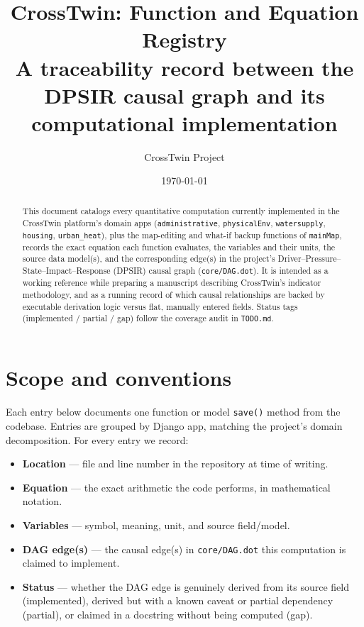 \documentclass[11pt]{article}
\title{CrossTwin: Function and Equation Registry\\
\large A traceability record between the DPSIR causal graph and its computational implementation}
\author{CrossTwin Project}
\date{\today}
\newcommand{\code}[1]{\texttt{#1}}
\newcommand{\statusdone}{\textcolor{green!50!black}{implemented}}
\newcommand{\statuspartial}{\textcolor{orange!80!black}{partial}}
\newcommand{\statusgap}{\textcolor{red!70!black}{gap}}
\begin{document}
\maketitle

\begin{abstract}
This document catalogs every quantitative computation currently implemented in the CrossTwin platform's domain apps (\code{administrative}, \code{physicalEnv}, \code{watersupply}, \code{housing}, \code{urban\_heat}), plus the map-editing and what-if backup functions of \code{mainMap}, records the exact equation each function evaluates, the variables and their units, the source data model(s), and the corresponding edge(s) in the project's Driver--Pressure--State--Impact--Response (DPSIR) causal graph (\code{core/DAG.dot}). It is intended as a working reference while preparing a manuscript describing CrossTwin's indicator methodology, and as a running record of which causal relationships are backed by executable derivation logic versus flat, manually entered fields. Status tags (\statusdone{} / \statuspartial{} / \statusgap{}) follow the coverage audit in \code{TODO.md}.
\end{abstract}

\tableofcontents

\section{Scope and conventions}

Each entry below documents one function or model \code{save()} method from the codebase. Entries are grouped by Django app, matching the project's domain decomposition. For every entry we record:

\begin{itemize}[nosep]
  \item \textbf{Location} --- file and line number in the repository at time of writing.
  \item \textbf{Equation} --- the exact arithmetic the code performs, in mathematical notation.
  \item \textbf{Variables} --- symbol, meaning, unit, and source field/model.
  \item \textbf{DAG edge(s)} --- the causal edge(s) in \code{core/DAG.dot} this computation is claimed to implement.
  \item \textbf{Status} --- whether the DAG edge is genuinely derived from its source field (\statusdone{}), derived but with a known caveat or partial dependency (\statuspartial{}), or claimed in a docstring without being computed (\statusgap{}).
\end{itemize}
\end{document}
